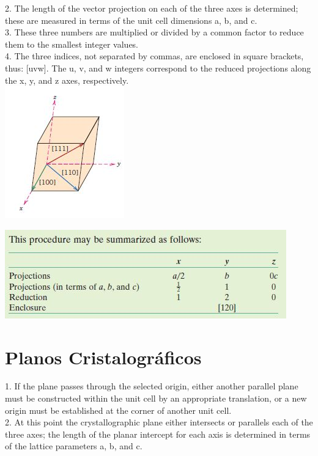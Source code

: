 2. The length of the vector projection on each of the three axes is determined;
these are measured in terms of the unit cell dimensions a, b, and c.
\\

3. These three numbers are multiplied or divided by a common factor to reduce
them to the smallest integer values.
\\

4. The three indices, not separated by commas, are enclosed in square brackets,
thus: [uvw]. The u, v, and w integers correspond to the reduced projections
along the x, y, and z axes, respectively.
\\

\includegraphics[scale=1,trim={0 0 0 0}]{figures/direcoesCrist}

\includegraphics[scale=0.6,trim={0 0 0 0}]{figures/direSum}


\section{Planos Cristalográficos}


1. If the plane passes through the selected origin, either another parallel plane
must be constructed within the unit cell by an appropriate translation, or a
new origin must be established at the corner of another unit cell.
\\

2. At this point the crystallographic plane either intersects or parallels each of
the three axes; the length of the planar intercept for each axis is determined
in terms of the lattice parameters a, b, and c.
\\

